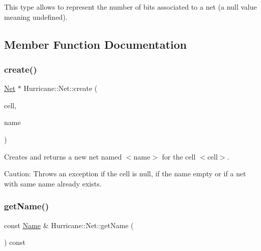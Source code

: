This type allows to represent the number of bits associated to a net (a null value meaning undefined). 

\subsection{Member Function Documentation}
\mbox{\label{classHurricane_1_1Net_ac1524cea15e8eacbf992c0cfb9e481db}} 
\subsubsection{\texorpdfstring{create()}{create()}}
{\footnotesize\ttfamily \mbox{\hyperlink{classHurricane_1_1Net}{Net}} $\ast$ Hurricane\+::\+Net\+::create (\begin{DoxyParamCaption}\item[{\mbox{\hyperlink{classHurricane_1_1Cell}{Cell}} $\ast$}]{cell,  }\item[{const \mbox{\hyperlink{classHurricane_1_1Name}{Name}} \&}]{name }\end{DoxyParamCaption})\hspace{0.3cm}{\ttfamily [static]}}

Creates and returns a new net named {\ttfamily $<$name$>$} for the cell {\ttfamily $<$cell$>$}.

\begin{DoxyParagraph}{Caution\+: Throws an exception if the cell is null, if the name empty or }
if a net with same name already exists. 
\end{DoxyParagraph}
\mbox{\label{classHurricane_1_1Net_aeba73ca641db371dde29baf348b58bba}} 
\subsubsection{\texorpdfstring{get\+Name()}{getName()}}
{\footnotesize\ttfamily const \mbox{\hyperlink{classHurricane_1_1Name}{Name}} \& Hurricane\+::\+Net\+::get\+Name (\begin{DoxyParamCaption}{ }\end{DoxyParamCaption}) const\hspace{0.3cm}{\ttfamily [inline]}}

